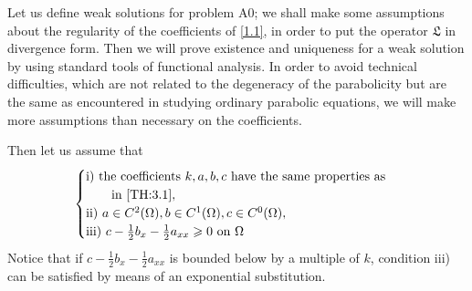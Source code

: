 \documentclass[a4paper,12pt,leqno]{article}
\numberwithin{equation}{section}
\begin{document}
Let us define weak solutions for problem A0; we shall make some assumptions about the regularity of the coefficients of \eqref{1.1}, in order to put the operator $\mathfrak{L}$ in divergence form. 
Then we will prove existence and uniqueness for a weak solution by using standard tools of functional analysis. 
In order to avoid technical difficulties, which are not related to the degeneracy of the parabolicity but are the same as encountered in studying ordinary parabolic equations, we will make more assumptions than necessary on the coefficients.

Then let us assume that
\begin{equation} \label{4.1}
	\begin{cases}
		\text{i) the coefficients $k, a, b, c$ have the same properties as} \\ \qquad \text{in \cref{TH:3.1}},\\
		\text{ii) } a \in C^{2}(\Omega), b \in C^{1}(\Omega), c \in C^{0}(\Omega), \\
		\text{iii) } c-\frac{1}{2} b_{x}-\frac{1}{2} a_{xx} \geqslant 0 \text{ on } \Omega
	\end{cases}
\end{equation}
Notice that if $c-\frac{1}{2} b_x -\frac{1}{2} a_{xx}$ is bounded below by a multiple of $k$, condition iii) can be satisfied by means of an exponential substitution.

\newpage
\end{document}
